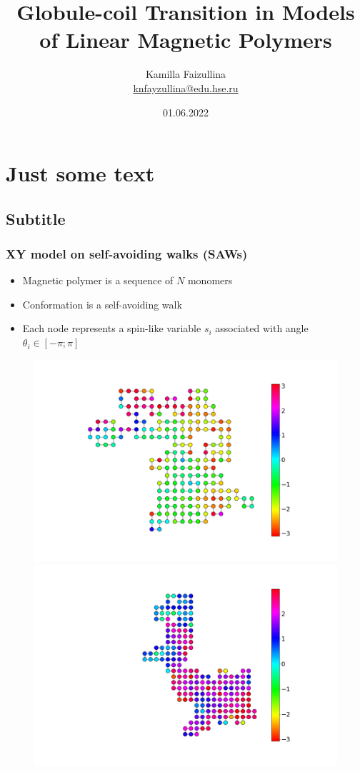 \documentclass{beamer}
\title[Short title]{Globule-coil Transition in Models of Linear Magnetic Polymers}
\author[ ]{Kamilla Faizullina \\ \smallskip \scriptsize \url{knfayzullina@edu.hse.ru}\\\url{  }}
\institute[Higher School of Economics]{Supervisor: Evgeni Burovski}
\date{01.06.2022}
\begin{document}

\frame[plain]{\titlepage}	%

\section{Just some text}
\subsection{Subtitle}

\begin{frame}
\frametitle{XY model on self-avoiding walks (SAWs)}
 	\begin{multicols}{2}
  
 		\begin{itemize}
 			\item Magnetic polymer is a sequence of $N$ monomers 
 			\item Conformation is a self-avoiding walk
 			\item Each node represents a spin-like variable $s_i$ associated with angle $\theta_i \in  [-\pi;\pi]$
 		\end{itemize}
   
 	\columnbreak
  
   \begin{figure}[H]
  	\centering
  	\includegraphics[scale=0.13]{state_example2.png} \\ 
  	\includegraphics[scale=0.13]{state_example1.png}
  	\label{fig:example}
  \end{figure}
  

\end{multicols}
\end{frame}
\end{document}
